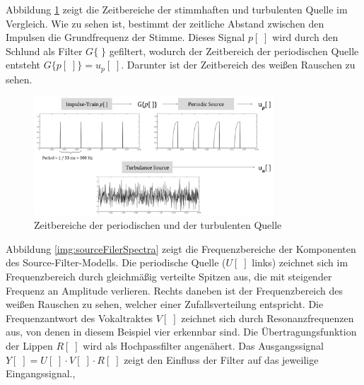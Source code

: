 Abbildung \ref{img:glottalSource} zeigt die Zeitbereiche der stimmhaften und turbulenten Quelle im Vergleich. Wie zu sehen ist, bestimmt der zeitliche Abstand zwischen den Impulsen die Grundfrequenz der Stimme. Dieses Signal $p[\;]$ wird durch den Schlund als Filter $G\{ \; \}$ gefiltert, wodurch der Zeitbereich der periodischen Quelle entsteht $G\{p[\;]\} = u_p[\;]$. Darunter ist der Zeitbereich des weißen Rauschen zu sehen. \cite[Source]{speechAcoustics}

\begin{figure}[H]
	\centering
	\includegraphics[width=0.8\textwidth]{bilder/glottalSource.png}
	\caption{Zeitbereiche der periodischen und der turbulenten Quelle \cite[Source]{speechAcoustics}}
	\label{img:glottalSource}
\end{figure}	

Abbildung \ref{img:sourceFilerSpectra} zeigt die Frequenzbereiche der Komponenten des Source-Filter-Modells. Die periodische Quelle ($U[\;]$ links) zeichnet sich im Frequenzbereich durch gleichmäßig verteilte Spitzen aus, die mit steigender Frequenz an Amplitude verlieren. Rechts daneben ist der Frequenzbereich des weißen Rauschen zu sehen, welcher einer Zufallsverteilung entspricht. Die Frequenzantwort des Vokaltraktes $V[\;]$ zeichnet sich durch Resonanzfrequenzen aus, von denen in diesem Beispiel vier  erkennbar sind. Die Übertragungsfunktion der Lippen $R[\;]$ wird als Hochpassfilter angenähert. Das Ausgangssignal $Y[\;] = U[\;] \cdot V[\;] \cdot R[\;]$ zeigt den Einfluss der Filter auf das jeweilige Eingangssignal.\cite[Source estimation]{ricardo_ceps}, \cite[Vocal Tract Resonance]{speechAcoustics}

